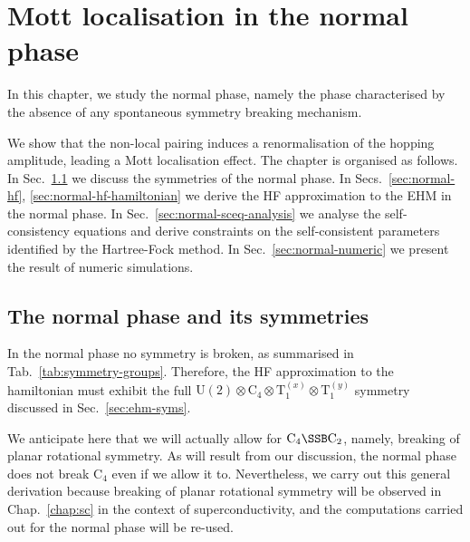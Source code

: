 \def\GraphicsFolder{chapters/normal-phase/pictures}
\chapter{Mott localisation in the normal phase}\label{chap:normal}

In this chapter, we study the normal phase, namely the phase characterised by the absence of any spontaneous symmetry breaking mechanism.

We show that the non-local pairing induces a renormalisation of the hopping amplitude, leading a Mott localisation effect. The chapter is organised as follows. In Sec.~\ref{sec:normal-phase-theory} we discuss the symmetries of the normal phase. In Secs.~\ref{sec:normal-hf}, \ref{sec:normal-hf-hamiltonian} we derive the HF approximation to the EHM in the normal phase. In Sec.~\ref{sec:normal-sceq-analysis} we analyse the self-consistency equations and derive constraints on the self-consistent parameters identified by the Hartree-Fock method. In Sec.~\ref{sec:normal-numeric} we present the result of numeric simulations.

\section{The normal phase and its  symmetries}\label{sec:normal-phase-theory}

In the normal phase no symmetry is broken, as summarised in Tab.~\ref{tab:symmetry-groups}. Therefore, the HF approximation to the hamiltonian must exhibit the full $\mathrm{U}(2) \otimes \mathrm{C}_4 \otimes \mathrm{T}_1^{(x)} \otimes \mathrm{T}_1^{(y)}$ symmetry discussed in Sec.~\ref{sec:ehm-syms}.

We anticipate here that we will actually allow for $\mathrm{C}_4 \SSB \mathrm{C}_2$, namely, breaking of planar rotational symmetry. As will result from our discussion, the normal phase does not break $\mathrm{C}_4$ even if we allow it to. Nevertheless, we carry out this general derivation because breaking of planar rotational symmetry will be observed in Chap.~\ref{chap:sc} in the context of superconductivity, and the computations carried out for the normal phase will be re-used.
 
